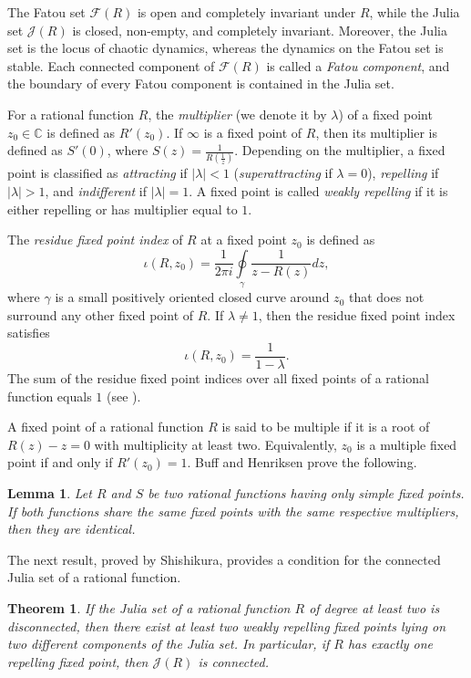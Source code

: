 \documentclass[12pt]{article}
\newtheorem{thm}{Theorem}[section]
\newtheorem{lem}{Lemma}[section]
\numberwithin{equation}{section}
\begin{document}
The Fatou set $\mathcal{F}(R)$ is open and completely invariant under $R$, while the Julia set $\mathcal{J}(R)$ is closed, non-empty, and completely invariant. Moreover, the Julia set is the locus of chaotic dynamics, whereas the dynamics on the Fatou set is stable. Each connected component of $\mathcal{F}(R)$ is called a \textit{Fatou component}, and the boundary of every Fatou component is contained in the Julia set.

For a rational function $R$, the \textit{multiplier} (we denote it by $\lambda$) of a fixed point $z_0\in \mathbb{C}$ is defined as $R'(z_0)$. If $\infty$ is a fixed point of $R$, then its multiplier is defined as $S'(0)$, where $S(z)=\frac{1}{R(\frac{1}{z})}$. Depending on the multiplier, a fixed point is classified as \textit{attracting} if $|\lambda|<1$ (\textit{superattracting} if $\lambda=0$), \textit{repelling} if $|\lambda|>1$, and \textit{indifferent} if $|\lambda|=1$. A fixed point is called \textit{weakly repelling} if it is either repelling or has multiplier equal to $1$.

The \textit{residue fixed point index} of $R$ at a fixed point $z_0$ is defined as 
$$
\iota (R,z_0)= \frac{1}{2 \pi i} {\oint\limits_{\gamma}\frac{1}{z-R(z)}dz},
$$
where $\gamma$ is a small positively oriented closed curve around $z_0$ that does not surround any other fixed point of $R$. If $\lambda\neq 1$, then the residue fixed point index satisfies
\begin{equation}\label{FPI_simple}
\iota (R,z_0)=\frac{1}{1-\lambda}.
\end{equation}
The sum of the residue fixed point indices over all fixed points of a rational function equals $1$ (see \cite[Theorem 12.4]{Milnor_book}).

A fixed point of a rational function $R$ is said to be multiple if it is a root of $R(z)-z=0$ with multiplicity at least two. Equivalently, $z_0$ is a multiple fixed point if and only if $R'(z_0)=1$. Buff and Henriksen prove the following.
\begin{lem}{\cite[Lemma 7]{BH2003}}\label{equal_rat}
	Let $R$ and $S$ be two rational functions having only simple fixed points. If both functions share the same fixed points with the same respective multipliers, then they are identical.
\end{lem}

The next result, proved by Shishikura, provides a condition for the connected Julia set of a rational function.
\begin{thm}{\cite[Theorem I]{Shishikura2009}}\label{shishikura}
If the Julia set of a rational function $R$ of degree at least two is disconnected, then there exist at least two weakly repelling fixed points lying on two different components of the Julia set. In particular, if $R$ has exactly one repelling fixed point, then $\mathcal{J}(R)$ is connected.
\end{thm}
\end{document}
